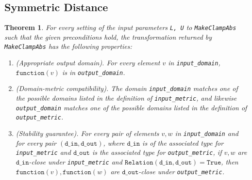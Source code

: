 \documentclass[11pt,a4paper]{article}
\newtheorem{theorem}{Theorem}
\theoremstyle{definition}
\newcommand{\din}{\texttt{d\_in}}
\newcommand{\dout}{\texttt{d\_out}}
\newcommand{\Relation}{\texttt{Relation}}
\newcommand{\True}{\texttt{True}}
\newcommand{\function}{\texttt{function}}
\begin{document}
\subsection{Symmetric Distance}
\begin{theorem}
    For every setting of the input parameters \texttt{L, U} to \texttt{MakeClampAbs} such that the given preconditions
    hold, the transformation returned by \texttt{MakeClampAbs} has the following properties:
    \begin{enumerate}
        \item \textup{(Appropriate output domain).} For every element $v$ in \texttt{input\_domain}, $\function(v)$ is in \texttt{output\_domain}.
        
        \item \textup{(Domain-metric compatibility).} The domain \texttt{input\_domain} matches one of the possible domains listed in the definition of \texttt{input\_metric}, and likewise \texttt{output\_domain} matches one of the possible domains listed in the definition of \texttt{output\_metric}.
        
        \item \textup{(Stability guarantee).} For every pair of elements $v, w$ in \texttt{input\_domain} and for every pair $(\din, \dout)$,  where $\din$ is of the associated type for \texttt{input\_metric} and $\dout$ is the associated type for \texttt{output\_metric}, if $v,w$ are $\din$-close under \texttt{input\_metric} and $\Relation(\din, \dout) = \True$, then $\function(v), \function(w)$ are $\dout$-close under \texttt{output\_metric}.
    \end{enumerate}
\end{theorem}
\end{document}
